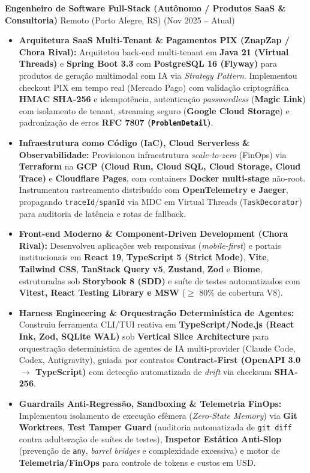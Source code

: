 \documentclass[10pt, letterpaper]{article}
\begin{document}
\textbf{Engenheiro de Software Full-Stack (Aut\^onomo / Produtos SaaS \& Consultoria)} \hfill Remoto (Porto Alegre, RS) \hfill (Nov 2025 -- Atual)
\begin{itemize}[itemsep=0.5pt, topsep=1pt, parsep=0pt, leftmargin=10pt]
    \item \textbf{Arquitetura SaaS Multi-Tenant \& Pagamentos PIX (ZnapZap / Chora Rival):} Arquitetou back-end multi-tenant em \textbf{Java 21 (Virtual Threads)} e \textbf{Spring Boot 3.3} com \textbf{PostgreSQL 16 (Flyway)} para produtos de gera\c{c}\~ao multimodal com IA via \textit{Strategy Pattern}. Implementou checkout PIX em tempo real (Mercado Pago) com valida\c{c}\~ao criptogr\'afica \textbf{HMAC SHA-256} e idempot\^encia, autentica\c{c}\~ao \textit{passwordless} (\textbf{Magic Link}) com isolamento de tenant, streaming seguro (\textbf{Google Cloud Storage}) e padroniza\c{c}\~ao de erros \textbf{RFC 7807 (\texttt{ProblemDetail})}.
    \item \textbf{Infraestrutura como C\'odigo (IaC), Cloud Serverless \& Observabilidade:} Provisionou infraestrutura \textit{scale-to-zero} (FinOps) via \textbf{Terraform} na \textbf{GCP (Cloud Run, Cloud SQL, Cloud Storage, Cloud Trace)} e \textbf{Cloudflare Pages}, com containers \textbf{Docker multi-stage} n\~ao-root. Instrumentou rastreamento distribu\'ido com \textbf{OpenTelemetry e Jaeger}, propagando \texttt{traceId}/\texttt{spanId} via MDC em Virtual Threads (\texttt{TaskDecorator}) para auditoria de lat\^encia e rotas de fallback.
    \item \textbf{Front-end Moderno \& Component-Driven Development (Chora Rival):} Desenvolveu aplica\c{c}\~oes web responsivas (\textit{mobile-first}) e portais institucionais em \textbf{React 19}, \textbf{TypeScript 5 (Strict Mode)}, \textbf{Vite}, \textbf{Tailwind CSS}, \textbf{TanStack Query v5}, \textbf{Zustand}, \textbf{Zod} e \textbf{Biome}, estruturadas sob \textbf{Storybook 8 (SDD)} e su\'ite de testes automatizados com \textbf{Vitest, React Testing Library e MSW} ($\ge$ 80\% de cobertura V8).
    \item \textbf{Harness Engineering \& Orquestra\c{c}\~ao Determin\'istica de Agentes:} Construiu ferramenta CLI/TUI reativa em \textbf{TypeScript/Node.js (React Ink, Zod, SQLite WAL)} sob \textbf{Vertical Slice Architecture} para orquestra\c{c}\~ao determin\'istica de agentes de IA multi-provider (Claude Code, Codex, Antigravity), guiada por contratos \textbf{Contract-First (OpenAPI 3.0 $\to$ TypeScript)} com detec\c{c}\~ao automatizada de \textit{drift} via checksum \textbf{SHA-256}.
    \item \textbf{Guardrails Anti-Regress\~ao, Sandboxing \& Telemetria FinOps:} Implementou isolamento de execu\c{c}\~ao ef\^emera (\textit{Zero-State Memory}) via \textbf{Git Worktrees}, \textbf{Test Tamper Guard} (auditoria automatizada de \texttt{git diff} contra adultera\c{c}\~ao de su\'ites de testes), \textbf{Inspetor Est\'atico Anti-Slop} (preven\c{c}\~ao de \texttt{any}, \textit{barrel bridges} e complexidade excessiva) e motor de \textbf{Telemetria/FinOps} para controle de tokens e custos em USD.
\end{itemize}
\end{document}

